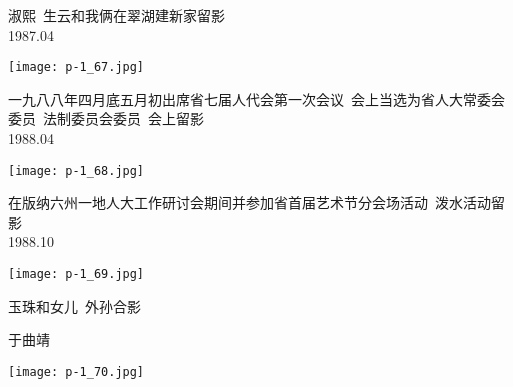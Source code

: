 \begin{tcolorbox}[notitle,grow to right by=1in,boxrule=0pt,colback=DarkRed,colframe=DarkRed]
    \fontsize{1cm}{0.9cm}\selectfont
    \raggedleft
    \noindent
    淑熙~生云和我俩在翠湖建新家留影\\
    \Large
    1987.04\\
    
\end{tcolorbox}
\begin{center}
    \texttt{[image: p-1\_67.jpg]}
\end{center}
\clearpage


\begin{tcolorbox}[notitle,grow to right by=1in,boxrule=0pt,colback=DarkRed,colframe=DarkRed]
    \fontsize{1cm}{0.9cm}\selectfont
    \raggedleft
    \noindent
    一九八八年四月底五月初出席省七届人代会第一次会议~会上当选为省人大常委会委员~法制委员会委员~会上留影\\
    \Large
    1988.04\\
    
\end{tcolorbox}
\begin{center}
    \texttt{[image: p-1\_68.jpg]}
\end{center}
\clearpage


\begin{tcolorbox}[notitle,grow to right by=1in,boxrule=0pt,colback=DarkRed,colframe=DarkRed]
    \fontsize{1cm}{0.9cm}\selectfont
    \raggedleft
    \noindent
    在版纳六州一地人大工作研讨会期间并参加省首届艺术节分会场活动~泼水活动留影\\
    \Large
    1988.10\\
    
\end{tcolorbox}
\begin{center}
    \texttt{[image: p-1\_69.jpg]}
\end{center}
\clearpage


\begin{tcolorbox}[notitle,grow to right by=1in,boxrule=0pt,colback=DarkRed,colframe=DarkRed]
    \fontsize{1cm}{0.9cm}\selectfont
    \raggedleft
    \noindent
    玉珠和女儿~外孙合影\\
    \Large

    于曲靖
\end{tcolorbox}
\begin{center}
    \texttt{[image: p-1\_70.jpg]}
\end{center}
\clearpage


